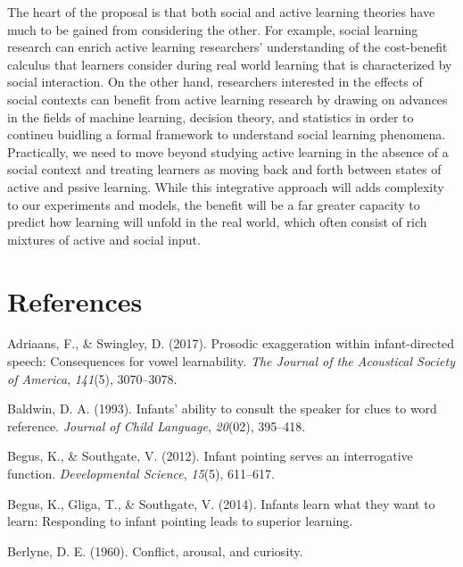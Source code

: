 \documentclass[english,floatsintext,man]{apa6}
\theoremstyle{definition}
\theoremstyle{definition}
\theoremstyle{definition}
\theoremstyle{remark}
\begin{document}
The heart of the proposal is that both social and active learning
theories have much to be gained from considering the other. For example,
social learning research can enrich active learning researchers'
understanding of the cost-benefit calculus that learners consider during
real world learning that is characterized by social interaction. On the
other hand, researchers interested in the effects of social contexts can
benefit from active learning research by drawing on advances in the
fields of machine learning, decision theory, and statistics in order to
contineu buidling a formal framework to understand social learning
phenomena. Practically, we need to move beyond studying active learning
in the absence of a social context and treating learners as moving back
and forth between states of active and pssive learning. While this
integrative approach will adds complexity to our experiments and models,
the benefit will be a far greater capacity to predict how learning will
unfold in the real world, which often consist of rich mixtures of active
and social input.

\newpage

\section{References}\label{references}

\setlength{\parindent}{-0.5in} \setlength{\leftskip}{0.5in}

\hypertarget{refs}{}
\hypertarget{ref-adriaans2017prosodic}{}
Adriaans, F., \& Swingley, D. (2017). Prosodic exaggeration within
infant-directed speech: Consequences for vowel learnability. \emph{The
Journal of the Acoustical Society of America}, \emph{141}(5),
3070--3078.

\hypertarget{ref-baldwin1993infants}{}
Baldwin, D. A. (1993). Infants' ability to consult the speaker for clues
to word reference. \emph{Journal of Child Language}, \emph{20}(02),
395--418.

\hypertarget{ref-begus2012infant}{}
Begus, K., \& Southgate, V. (2012). Infant pointing serves an
interrogative function. \emph{Developmental Science}, \emph{15}(5),
611--617.

\hypertarget{ref-begus2014infants}{}
Begus, K., Gliga, T., \& Southgate, V. (2014). Infants learn what they
want to learn: Responding to infant pointing leads to superior learning.

\hypertarget{ref-berlyne1960conflict}{}
Berlyne, D. E. (1960). Conflict, arousal, and curiosity.
\end{document}
